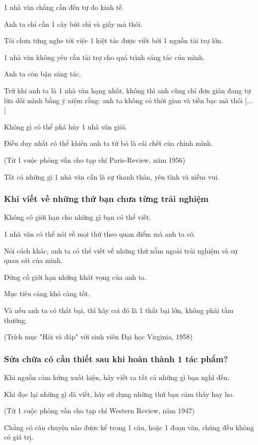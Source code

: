 \documentclass{article}
\begin{document}
1 nhà văn chẳng cần đến tự do kinh tế.

Anh ta chỉ cần 1 cây bút chì và giấy mà thôi.

Tôi chưa từng nghe tới việc 1 kiệt tác được viết bởi 1 nguồn tài trợ lớn.

1 nhà văn không yêu cầu tài trợ cho quá trình sáng tác của mình.

Anh ta còn bận sáng tác.

Trừ khi anh ta là 1 nhà văn hạng nhất, không thì anh cũng chỉ đơn giản đang tự lừa dối mình bằng ý niệm rằng: anh ta không có thời gian và tiền bạc mà thôi [$\ldots$]

Không gì có thể phá hủy 1 nhà văn giỏi.

Điều duy nhất có thể khiến anh ta từ bỏ là cái chết của chính mình.

(Từ 1 cuộc phỏng vấn cho tạp chí Paris-Review, năm 1956)

\textsf{Tất cả những gì 1 nhà văn cần là sự thanh thản, yên tĩnh và niềm vui.}

\subsubsection{Khi viết về những thứ bạn chưa từng trải nghiệm}
Không có giới hạn cho những gì bạn có thể viết.

1 nhà văn có thể nói về mọi thứ theo quan điểm mà anh ta có.

Nói cách khác, anh ta có thể viết về những thứ nằm ngoài trải nghiệm và sự quan sát của mình.

Đừng cố giới hạn những khát vọng của anh ta.

Mục tiêu càng khó càng tốt.

Và nếu anh ta có thất bại, thì hãy coi đó là 1 thất bại lớn, không phải tầm thường.

(Trích mục "Hỏi và đáp" với sinh viên Đại học Virginia, 1958)

\subsubsection{Sửa chữa có cần thiết sau khi hoàn thành 1 tác phẩm?}
Khi nguồn cảm hứng xuất hiện, hãy viết ra tất cả những gì bạn nghĩ đến.

Khi đọc lại những gì đã viết, hãy sử dụng những thứ bạn cảm thấy hay ho.

(Từ 1 cuộc phỏng vấn cho tạp chí Western Review, năm 1947)

%
Chẳng có câu chuyện nào được kể trong 1 câu, hoặc 1 đoạn văn, chúng đều không có giá trị.
\end{document}
